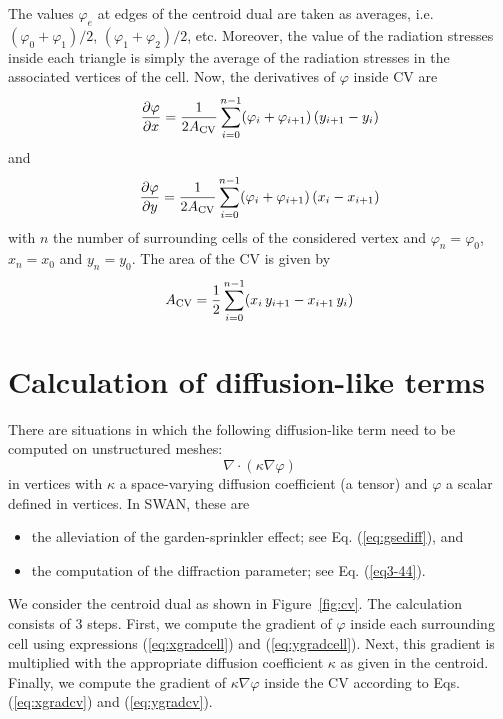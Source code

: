 \documentclass[12pt]{book}
\begin{document}
The values $\varphi_e$ at edges of the centroid dual are taken as averages, i.e. $(\varphi_0+\varphi_1)/2$, $(\varphi_1+\varphi_2)/2$, etc.
Moreover, the value of the radiation stresses
inside each triangle is simply the average of the radiation stresses in the associated vertices of the cell. Now, the derivatives of $\varphi$ inside
CV are
\begin{equation}
  \frac{\partial \varphi}{\partial x} = \frac{1}{2A_{\rm CV}} \sum_{i=0}^{n-1} (\varphi_i+\varphi_{i+1})\,(y_{i+1}-y_i)
  \label{eq:xgradcv}
\end{equation}
and
\begin{equation}
  \frac{\partial \varphi}{\partial y} = \frac{1}{2A_{\rm CV}} \sum_{i=0}^{n-1} (\varphi_i+\varphi_{i+1})\,(x_i-x_{i+1})
  \label{eq:ygradcv}
\end{equation}
with $n$ the number of surrounding cells of the considered vertex and $\varphi_n = \varphi_0$, $x_n = x_0$ and $y_n = y_0$.
The area of the CV is given by
\begin{equation}
  A_{\rm CV} = \frac{1}{2} \sum_{i=0}^{n-1} (x_i\,y_{i+1} - x_{i+1}\,y_i)
\end{equation}

\section{Calculation of diffusion-like terms}

There are situations in which the following diffusion-like term need to be computed on unstructured meshes:
\begin{equation}
  \nabla \cdot \left ( \kappa \nabla \varphi \right )
\end{equation}
in vertices with $\kappa$ a space-varying diffusion coefficient (a tensor) and $\varphi$  a scalar defined in vertices. In SWAN, these are
\begin{itemize}
  \item the alleviation of the garden-sprinkler effect; see Eq. (\ref{eq:gsediff}), and
  \item the computation of the diffraction parameter; see Eq. (\ref{eq3-44}).
\end{itemize}
We consider the centroid dual as shown in Figure~\ref{fig:cv}. The calculation consists of 3 steps. First, we compute the gradient of $\varphi$ inside
each surrounding cell using expressions (\ref{eq:xgradcell}) and (\ref{eq:ygradcell}). Next, this gradient is multiplied with the appropriate diffusion
coefficient $\kappa$ as given in the centroid. Finally, we compute the gradient of $\kappa \nabla \varphi$ inside the CV according to
Eqs. (\ref{eq:xgradcv}) and (\ref{eq:ygradcv}).
\end{document}
